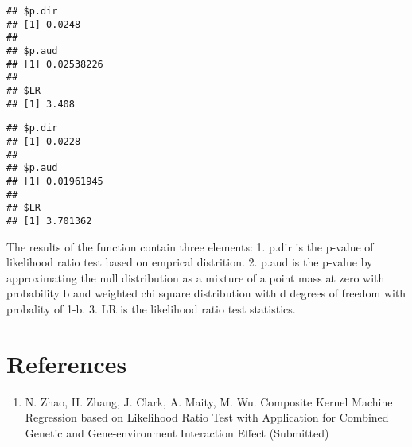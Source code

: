 \documentclass[11pt,]{article}
\newenvironment{Shaded}{\begin{snugshade}}{\end{snugshade}}
\newcommand{\KeywordTok}[1]{\textcolor[rgb]{0.13,0.29,0.53}{\textbf{#1}}}
\newcommand{\DataTypeTok}[1]{\textcolor[rgb]{0.13,0.29,0.53}{#1}}
\newcommand{\StringTok}[1]{\textcolor[rgb]{0.31,0.60,0.02}{#1}}
\newcommand{\CommentTok}[1]{\textcolor[rgb]{0.56,0.35,0.01}{\textit{#1}}}
\newcommand{\OperatorTok}[1]{\textcolor[rgb]{0.81,0.36,0.00}{\textbf{#1}}}
\newcommand{\NormalTok}[1]{#1}
\providecommand{\tightlist}{%
\setlength{\itemsep}{0pt}\setlength{\parskip}{0pt}}
\begin{document}
\begin{verbatim}
## $p.dir
## [1] 0.0248
## 
## $p.aud
## [1] 0.02538226
## 
## $LR
## [1] 3.408
\end{verbatim}

\begin{Shaded}
\end{Shaded}

\begin{verbatim}
## $p.dir
## [1] 0.0228
## 
## $p.aud
## [1] 0.01961945
## 
## $LR
## [1] 3.701362
\end{verbatim}

The results of the function contain three elements: 1. p.dir is the
p-value of likelihood ratio test based on emprical distrition. 2. p.aud
is the p-value by approximating the null distribution as a mixture of a
point mass at zero with probability b and weighted chi square
distribution with d degrees of freedom with probality of 1-b. 3. LR is
the likelihood ratio test statistics.

\section{References}\label{references}

\begin{enumerate}
\def\labelenumi{\arabic{enumi}.}
\tightlist
\item
  N. Zhao, H. Zhang, J. Clark, A. Maity, M. Wu. Composite Kernel Machine
  Regression based on Likelihood Ratio Test with Application for
  Combined Genetic and Gene-environment Interaction Effect (Submitted)
\end{enumerate}




\newpage
\singlespacing 
\end{document}
